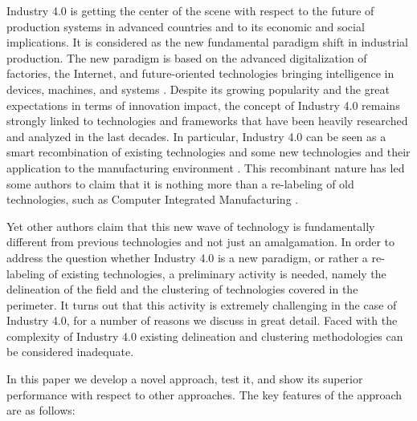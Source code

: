 \documentclass[]{book}
\theoremstyle{definition}
\theoremstyle{definition}
\theoremstyle{definition}
\theoremstyle{remark}
\begin{document}
Industry 4.0 is getting the center of the scene with respect to the
future of production systems in advanced countries and to its economic
and social implications. It is considered as the new fundamental
paradigm shift in industrial production. The new paradigm is based on
the advanced digitalization of factories, the Internet, and
future-oriented technologies bringing intelligence in devices, machines,
and systems \citep{lasi2014industry}. Despite its growing popularity and
the great expectations in terms of innovation impact, the concept of
Industry 4.0 remains strongly linked to technologies and frameworks that
have been heavily researched and analyzed in the last decades. In
particular, Industry 4.0 can be seen as a smart recombination of
existing technologies and some new technologies and their application to
the manufacturing environment \citep{trappey2016review}. This
recombinant nature has led some authors to claim that it is nothing more
than a re-labeling of old technologies, such as Computer Integrated
Manufacturing \citep{apreda2016functional}.

Yet other authors claim that this new wave of technology is
fundamentally different from previous technologies and not just an
amalgamation. In order to address the question whether Industry 4.0 is a
new paradigm, or rather a re-labeling of existing technologies, a
preliminary activity is needed, namely the delineation of the field and
the clustering of technologies covered in the perimeter. It turns out
that this activity is extremely challenging in the case of Industry 4.0,
for a number of reasons we discuss in great detail. Faced with the
complexity of Industry 4.0 existing delineation and clustering
methodologies can be considered inadequate.

In this paper we develop a novel approach, test it, and show its
superior performance with respect to other approaches. The key features
of the approach are as follows:
\end{document}
